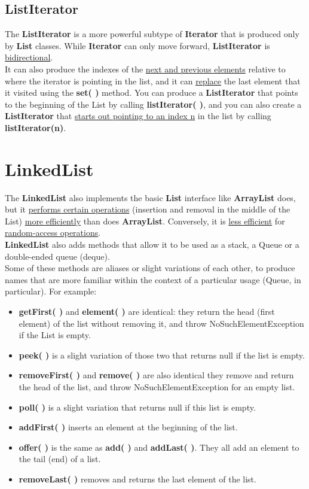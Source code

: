 \documentclass[10pt,letterpaper]{report}
\begin{document}
\subsection{ListIterator}
The \textbf{ListIterator} is a more powerful subtype of \textbf{Iterator} that is produced only by \textbf{List} classes. While \textbf{Iterator} can only move forward, \textbf{ListIterator} is \underline{bidirectional}.\\
It can also produce the indexes of the \underline{next and previous elements} relative to where the iterator is pointing in the list, and it can \underline{replace} the last element that it visited using the \textbf{set( )} method. 
You can produce a \textbf{ListIterator} that points to the beginning of the List by calling \textbf{listIterator( )}, and you can also create a \textbf{ListIterator} that \underline{starts out pointing to an index n} in the list by calling \textbf{listIterator(n)}.

\section{LinkedList}
The \textbf{LinkedList} also implements the basic \textbf{List} interface like \textbf{ArrayList} does, but it \underline{performs certain operations} (insertion and removal in the middle of the List) \underline{more efficiently} than does \textbf{ArrayList}. Conversely, it is \underline{less efficient} for \underline{random-access operations}.\\
\textbf{LinkedList} also adds methods that allow it to be used as a stack, a Queue or a double-ended queue (deque).\\
Some of these methods are aliases or slight variations of each other, to produce names that are more familiar within the context of a particular usage (Queue, in particular). For example:
\begin{itemize}
\item \textbf{getFirst( )} and \textbf{element( )} are identical: they return the head (first element) of the list without removing it, and throw NoSuchElementException if the List is empty.
\item \textbf{peek( )} is a slight variation of those two that returns null if the list is empty.
\item \textbf{removeFirst( )} and \textbf{remove( )} are also identical they remove and return the head of the list, and throw NoSuchElementException for an empty list.
\item \textbf{poll( )} is a slight variation that returns null if this list is empty.
\item \textbf{addFirst( )} inserts an element at the beginning of the list.
\item \textbf{offer( )} is the same as \textbf{add( )} and \textbf{addLast( )}. They all add an element to the tail (end) of a list.
\item \textbf{removeLast( )} removes and returns the last element of the list.
\end{itemize}
\end{document}

